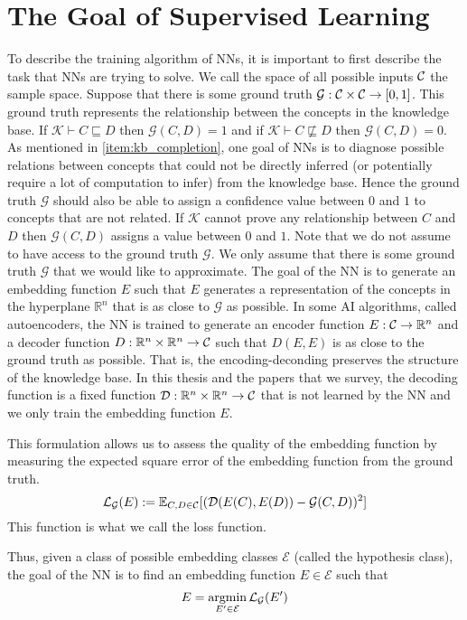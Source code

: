 \section{The Goal of Supervised Learning}
To describe the training algorithm of NNs, it is important to first describe the task 
that NNs are trying to solve.
We call the space of all possible inputs $\mathcal{C}$ the sample space.
Suppose that there is some ground truth $\mathcal{G}:\mathcal{C}\times\mathcal{C}\to[0,1]$.
This ground truth represents the relationship between the concepts in the knowledge base.
If $\mathcal{K}\vdash C\sqsubseteq D$ then $\mathcal{G}(C,D)=1$ and if $\mathcal{K}\vdash C\not\sqsubseteq D$ then $\mathcal{G}(C,D)=0$.
As mentioned in \ref{item:kb_completion}, one goal of NNs is
to diagnose possible relations between concepts that could not be directly inferred (or potentially require a lot of computation to infer) from the knowledge base.
Hence the ground truth $\mathcal{G}$ should also be able to assign a confidence value between $0$ and $1$ to concepts that are not related.
If $\mathcal{K}$ cannot prove any relationship between $C$ and $D$ then $\mathcal{G}(C,D)$ assigns a value between $0$ and $1$.
Note that we do not assume to have access to the ground truth $\mathcal{G}$.
We only assume that there is some ground truth $\mathcal{G}$ that we would like to approximate.
The goal of the NN is to generate an embedding function $E$ such that $E$ generates a representation
of the concepts in the hyperplane $\mathbb{R}^n$ that
is as close to $\mathcal{G}$ as possible.
In some AI algorithms, called autoencoders,
the NN is trained to generate an encoder function $E:\mathcal{C}\to\mathbb{R}^n$ and a decoder function 
$D:\mathbb{R}^n\times\mathbb{R}^n \to\mathcal{C}$ such that $D(E,E)$ is as close to the ground truth as possible.
That is, the encoding-deconding preserves the structure of the knowledge base.
In this thesis and the papers that we survey, the decoding function is a fixed function $\mathcal{D}: \mathbb{R}^n\times\mathbb{R}^n\to\mathcal{C}$
that is not learned by the NN and we only train the embedding function $E$.

This formulation allows us to assess the quality of the embedding function by measuring the expected square error of the embedding function from the ground truth.
\[
    \mathcal{L}_{\mathcal{G}}(E):=\mathbb{E}_{C,D\in\mathcal{C}}[(\mathcal{D}(E(C),E(D))-\mathcal{G}(C,D))^2]
\]
This function is what we call the loss function.

Thus, given a class of possible embedding classes $\mathcal{E}$ (called the hypothesis class), the goal of the NN is to find an embedding function $E\in\mathcal{E}$
such that
\[
    E=\mathop{\mathrm{argmin}}\limits_{E'\in\mathcal{E}}\mathcal{L}_{\mathcal{G}}(E')    
\]


